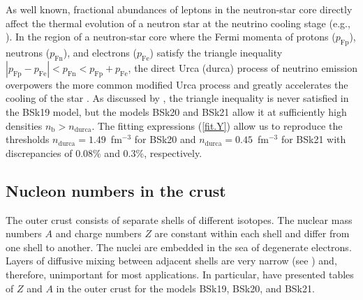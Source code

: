 \documentclass{aa}
\newcommand{\nb}{n_\mathrm{b}}
\begin{document}
As well known, fractional abundances of leptons in the
neutron-star core directly affect the thermal evolution of a
neutron star at the neutrino cooling stage (e.g.,
\citealp{YakPethick,PageGW}). In the region of a
neutron-star core where the Fermi momenta of protons
($p_\mathrm{Fp}$), neutrons ($p_\mathrm{Fn}$), and electrons
($p_\mathrm{Fe}$) satisfy the triangle inequality
$|p_\mathrm{Fp}-p_\mathrm{Fe}| < p_\mathrm{Fn} <
p_\mathrm{Fp}+p_\mathrm{Fe}$, the direct Urca (durca)
process of neutrino emission overpowers the more common
modified Urca process and greatly accelerates the cooling of
the star \citep{Lattimer-ea91,Haensel95}. As discussed by
\citet{Chamel-ea11}, the triangle inequality is never
satisfied in the BSk19 model, but the models BSk20 and BSk21
allow it at sufficiently high densities
$\nb>n_\mathrm{durca}$. The fitting expressions
(\ref{fit.Y}) allow us to reproduce the thresholds
$n_\mathrm{durca}=1.49$~fm$^{-3}$ for BSk20 and
$n_\mathrm{durca}=0.45$~fm$^{-3}$ for BSk21
\citep{Chamel-ea11} with  discrepancies of 0.08\% and 0.3\%,
respectively.

\subsection{Nucleon numbers in the crust}
\label{sect:crust}

The outer crust consists of separate shells of 
different isotopes. The nuclear
mass
numbers $A$ and charge numbers $Z$ are constant
within each shell and differ from one shell to another.
The
nuclei are embedded in the sea of degenerate electrons.
Layers of diffusive mixing between adjacent shells are very
narrow (see \citealp{HameuryHB83}) and, therefore,
unimportant for most applications.
In particular, 
\citet{PearsonGC11} have presented tables of
$Z$ and $A$ in the outer crust for the models BSk19, BSk20,
and BSk21. 
\end{document}
